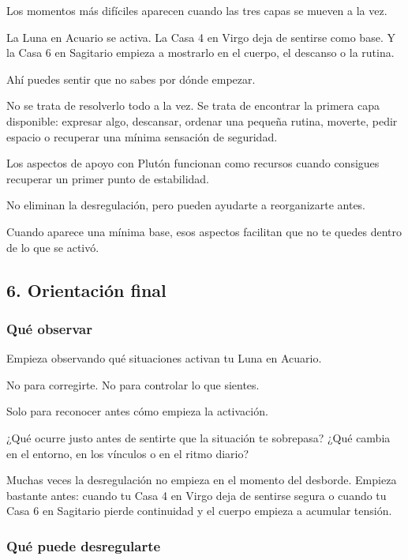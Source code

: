 \documentclass[11pt,a4paper]{article}
\begin{document}
Los momentos más difíciles aparecen cuando las tres capas se mueven a la vez.

La Luna en Acuario se activa.
La Casa 4 en Virgo deja de sentirse como base.
Y la Casa 6 en Sagitario empieza a mostrarlo en el cuerpo, el descanso o la rutina.

Ahí puedes sentir que no sabes por dónde empezar.

No se trata de resolverlo todo a la vez.
Se trata de encontrar la primera capa disponible: expresar algo, descansar, ordenar una pequeña rutina, moverte, pedir espacio o recuperar una mínima sensación de seguridad.

Los aspectos de apoyo con Plutón funcionan como recursos cuando consigues recuperar un primer punto de estabilidad.

No eliminan la desregulación, pero pueden ayudarte a reorganizarte antes.

Cuando aparece una mínima base, esos aspectos facilitan que no te quedes dentro de lo que se activó.

\vspace{0.8cm}

\subsection{6. Orientación final}

\subsubsection*{Qué observar}

Empieza observando qué situaciones activan tu Luna en Acuario.

No para corregirte.
No para controlar lo que sientes.

Solo para reconocer antes cómo empieza la activación.

¿Qué ocurre justo antes de sentirte que la situación te sobrepasa?
¿Qué cambia en el entorno, en los vínculos o en el ritmo diario?

Muchas veces la desregulación no empieza en el momento del desborde. Empieza bastante antes: cuando tu Casa 4 en Virgo deja de sentirse segura o cuando tu Casa 6 en Sagitario pierde continuidad y el cuerpo empieza a acumular tensión.

\subsubsection*{Qué puede desregularte}
\end{document}
